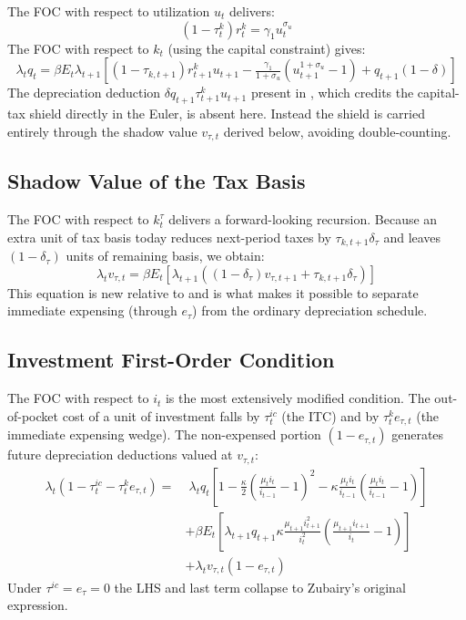 The FOC with respect to utilization $u_t$ delivers:
\begin{equation}\label{AppEqUtil}
    (1-\tau_t^k) r_t^k = \gamma_1 u_t^{\sigma_u}
\end{equation}
The FOC with respect to $k_t$ (using the capital constraint) gives:
\begin{equation}\label{AppEqCapEuler}
    \lambda_t q_t = \beta E_t \lambda_{t+1}
    \left[(1 - \tau_{k,t+1}) r_{t+1}^k u_{t+1}
     - \tfrac{\gamma_1}{1+\sigma_u}(u_{t+1}^{1+\sigma_u} - 1)
     + q_{t+1}(1 - \delta)\right]
\end{equation}
The depreciation deduction $\delta q_{t+1} \tau_{t+1}^k u_{t+1}$ present in , which credits the capital-tax shield directly in the Euler, is absent here. Instead the shield is carried entirely through the shadow value $v_{\tau,t}$ derived below, avoiding double-counting.

\subsection{Shadow Value of the Tax Basis}

The FOC with respect to $k_t^\tau$ delivers a forward-looking recursion. Because an extra unit of tax basis today reduces next-period taxes by $\tau_{k,t+1}\delta_\tau$ and leaves $(1 - \delta_\tau)$ units of remaining basis, we obtain:
\begin{equation}\label{AppEqVTau}
    \lambda_t v_{\tau,t} = \beta E_t
    \left[\lambda_{t+1}\left((1 - \delta_\tau) v_{\tau,t+1} + \tau_{k,t+1}\delta_\tau\right)\right]
\end{equation}
This equation is new relative to  and is what makes it possible to separate immediate expensing (through $e_\tau$) from the ordinary depreciation schedule.

\subsection{Investment First-Order Condition}

The FOC with respect to $i_t$ is the most extensively modified condition. The out-of-pocket cost of a unit of investment falls by $\tau_t^{ic}$ (the ITC) and by $\tau_t^k e_{\tau,t}$ (the immediate expensing wedge). The non-expensed portion $(1 - e_{\tau,t})$ generates future depreciation deductions valued at $v_{\tau,t}$:
\begin{equation}\label{AppEqInvFOC}
\begin{split}
    \lambda_t (1 - \tau_t^{ic} - \tau_t^k e_{\tau,t}) = & \; \lambda_t q_t \left[1 - \tfrac{\kappa}{2}\!\left(\tfrac{\mu_t i_t}{i_{t-1}} - 1\right)^2 - \kappa \tfrac{\mu_t i_t}{i_{t-1}}\!\left(\tfrac{\mu_t i_t}{i_{t-1}} - 1\right)\right] \\
    & + \beta E_t \left[\lambda_{t+1} q_{t+1} \kappa \tfrac{\mu_{t+1} i_{t+1}^2}{i_t^2}\!\left(\tfrac{\mu_{t+1} i_{t+1}}{i_t} - 1\right)\right] \\
    & + \lambda_t v_{\tau,t}(1 - e_{\tau,t})
\end{split}
\end{equation}
Under $\tau^{ic} = e_\tau = 0$ the LHS and last term collapse to Zubairy's original expression.

